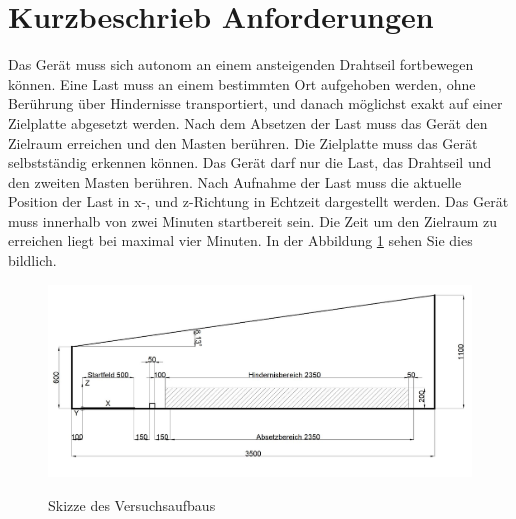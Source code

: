 \documentclass[a4paper]{report}
\begin{document}
\section{Kurzbeschrieb Anforderungen}
Das Gerät muss sich autonom an einem ansteigenden Drahtseil fortbewegen können. Eine Last muss an einem bestimmten Ort aufgehoben werden, ohne Berührung über Hindernisse transportiert, und danach möglichst exakt auf einer Zielplatte abgesetzt werden. Nach dem Absetzen der Last muss das Gerät den Zielraum erreichen und den Masten berühren. Die Zielplatte muss das Gerät selbstständig erkennen können. Das Gerät darf nur die Last, das Drahtseil und den zweiten Masten berühren. Nach Aufnahme der Last muss die aktuelle Position der Last in x-, und z-Richtung in Echtzeit dargestellt werden. Das Gerät muss innerhalb von zwei Minuten startbereit sein. Die Zeit um den Zielraum zu erreichen liegt bei maximal vier Minuten. In der Abbildung \ref{fig:Funktionsskizze} sehen Sie dies bildlich.


\begin{figure}[h!]
	\includegraphics[keepaspectratio,width=\textwidth]{PrenFunktionsskizze}
	\label{fig:Funktionsskizze}
	\caption{Skizze des Versuchsaufbaus}
\end{figure}
\end{document}
